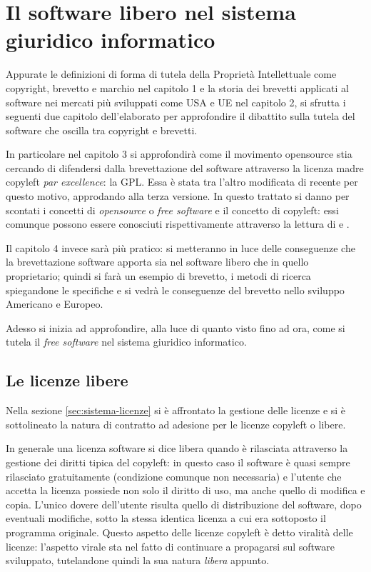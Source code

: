  \chapter{Il software libero nel sistema giuridico informatico}

Appurate le definizioni di forma di tutela della Proprietà Intellettuale come copyright, brevetto e marchio nel capitolo 1 e la storia dei brevetti applicati al software nei mercati più sviluppati come USA e UE nel capitolo 2, si sfrutta i seguenti due capitolo dell'elaborato per approfondire il dibattito sulla tutela del software che oscilla tra copyright e brevetti.

In particolare nel capitolo 3 si approfondirà come il movimento opensource stia cercando di difendersi dalla brevettazione del software attraverso la licenza madre copyleft \textit{par excellence}: la GPL. Essa è stata tra l'altro modificata di recente per questo motivo, approdando alla terza versione.
In questo trattato si danno per scontati i concetti di \textit{opensource} o \textit{free software} e il concetto di copyleft: essi comunque possono essere conosciuti rispettivamente attraverso la lettura di \cite[Compendio di libertà informatica e cultura open]{Aliprandi-compendio} e \cite[Copyleft e Opencontent]{Aliprandi-copyleft}.

Il capitolo 4 invece sarà più pratico: si metteranno in luce delle conseguenze che la brevettazione software apporta sia nel software libero che in quello proprietario; quindi si farà un esempio di brevetto, i metodi di ricerca spiegandone le specifiche e si vedrà le conseguenze del brevetto nello sviluppo Americano e Europeo.

Adesso si inizia ad approfondire, alla luce di quanto visto fino ad ora, come si tutela il \textit{free software} nel sistema giuridico informatico.


\section{Le licenze libere}

Nella sezione \ref{sec:sistema-licenze} si è affrontato la gestione delle licenze e si è sottolineato la natura di contratto ad adesione per le licenze copyleft o libere.

In generale una licenza software si dice libera quando è rilasciata attraverso la gestione dei diritti tipica del copyleft: in questo caso il software è quasi sempre rilasciato gratuitamente (condizione comunque non necessaria) e l'utente che accetta la licenza possiede non solo il diritto di uso, ma anche quello di modifica e copia. L'unico dovere dell'utente risulta quello di distribuzione del software, dopo eventuali modifiche, sotto la stessa identica licenza a cui era sottoposto il programma originale. Questo aspetto delle licenze copyleft è detto viralità delle licenze: l'aspetto virale sta nel fatto di continuare a propagarsi sul software sviluppato, tutelandone quindi la sua natura \textit{libera} appunto.


